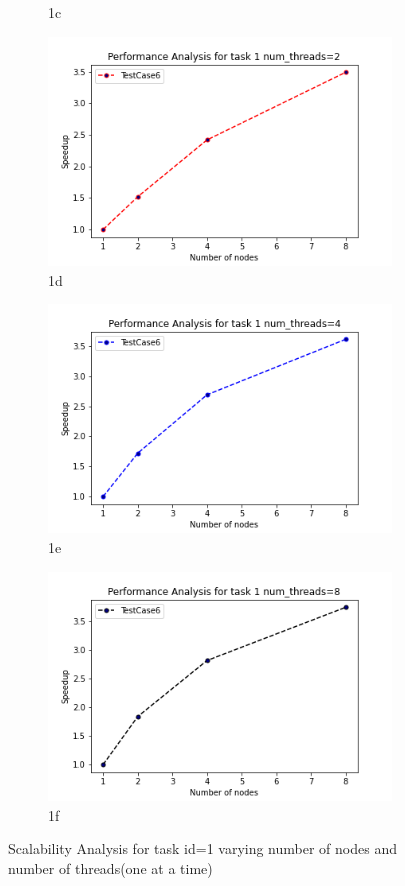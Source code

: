 \documentclass{article}
\begin{document}
\begin{figure}[H]
\begin{subfigure}{.5\textwidth}
  \caption{1c}
  \label{fig:sfig1}
\end{subfigure}%
\begin{subfigure}{.5\textwidth}
  \centering
  \includegraphics[width=.8\linewidth]{Assignment2/report/1thread=2.png}
  \caption{1d}
  \label{fig:sfig2}
\end{subfigure}
\begin{subfigure}{.5\textwidth}
  \centering
  \includegraphics[width=.8\linewidth]{Assignment2/report/1thread=4.png}
  \caption{1e}
  \label{fig:sfig1}
\end{subfigure}%
\begin{subfigure}{.5\textwidth}
  \centering
  \includegraphics[width=.8\linewidth]{Assignment2/report/1thread=8.png}
  \caption{1f}
  \label{fig:sfig2}
\end{subfigure}

\caption{Scalability Analysis for task id=1 varying number of nodes and number of threads(one at a time)}
\label{fig:fig}
\end{figure}
\end{document}
